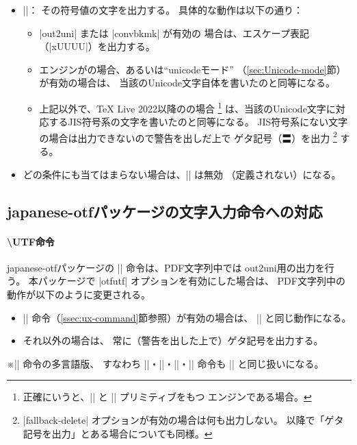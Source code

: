 \documentclass[uplatex,dvipdfmx,a4paper]{jsarticle}
\newcommand{\Pkg}[1]{\textsf{#1}}
\newcommand{\Note}{\par\noindent ※}
\newcommand{\Means}{：\quad}
\begin{document}
\begin{itemize}
\item ||\Means
  その符号値の文字を出力する。
  具体的な動作は以下の通り：
  \begin{itemize}
  \item |out2uni| または |convbkmk| が有効の
  場合は、エスケープ表記（|\0xUUUU|）を出力する。
  \item エンジンが{\upLaTeX}の場合、あるいは“unicodeモード”
  （\ref{sec:Unicode-mode}節）が有効の場合は、
  当該のUnicode文字自体を書いたのと同等になる。
  \item 上記以外で、{\TeX} Live 2022以降の{\pLaTeX}の場合
  \footnote{正確にいうと、|\Uchar| と |\ucs| プリミティブをもつ
    {\epTeX}エンジンである場合。}%
  は、当該のUnicode文字に対応するJIS符号系の文字を書いたのと同等になる。
  JIS符号系にない文字の場合は出力できないので警告を出しだ上で
  ゲタ記号（〓）を出力%
  \footnote{|fallback-delete| オプションが有効の場合は何も出力しない。
    以降で「ゲタ記号を出力」とある場合についても同様。}%
  する。
  \end{itemize}
  \item どの条件にも当てはまらない場合は、|\Ux| は無効
  （定義されない）になる。
\end{itemize}

\subsection{\Pkg{japanese-otf}パッケージの文字入力命令への対応}
\label{ssec:otf-package}

\paragraph{\textbackslash UTF命令}
\Pkg{japanese-otf}パッケージの |\UTF| 命令は、PDF文字列中では
out2uni用の出力を行う。
本パッケージで |otfutf| オプションを有効にした場合は、
PDF文字列中の動作が以下のように変更される。

\begin{itemize}
\item |\Ux| 命令（\ref{ssec:ux-command}節参照）が有効の場合は、
  |\Ux| と同じ動作になる。
\item それ以外の場合は、
  常に（警告を出した上で）ゲタ記号を出力する。
\end{itemize}

\Note |\UTF| 命令の多言語版、
すなわち |\UTFC|・|\UTFK|・|\UTFM|・|\UTFT| 命令も |\UTF|
と同じ扱いになる。
\end{document}
